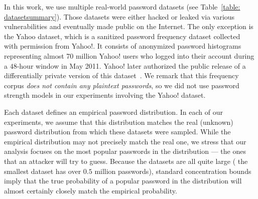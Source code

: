 In this work, we use multiple real-world password datasets (see Table~\ref{table: datasetsummary}). Those datasets were either hacked or leaked via various vulnerabilities and eventually made public on the Internet. The only exception is the Yahoo dataset, which is a sanitized password frequency dataset collected~\cite{SP:Bonneau12}  with permission from Yahoo!. It consists of anonymized password histograms representing almost 70 million Yahoo! users who logged into their account during a $48$-hour window in May 2011. Yahoo! later authorized the public release of a differentially private version of this dataset~\cite{NDSS:BloDatBon16}. We remark that this frequency corpus \textit{does not contain any plaintext passwords}, so we did not use password strength models in our experiments involving the Yahoo! dataset. 




Each dataset defines an empirical password distribution. In each of our experiments, we assume that this distribution matches the real (unknown) password distribution from which these datasets were sampled. While the empirical distribution may not precisely match the real one, we stress that our analysis focuses on the most popular passwords in the distribution --- the ones that an attacker will try to guess. Because the datasets are all quite large ( the smallest dataset has over $0.5$ million passwords), standard concentration bounds imply that the true probability of a popular password in the distribution will almost certainly closely match the empirical probability.


